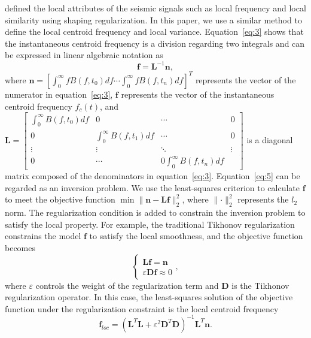 \cite{Fomel07a} defined the local attributes of the seismic signals
such as local frequency and local similarity using shaping
regularization. In this paper, we use a similar method to define the
local centroid frequency and local variance. Equation~\ref{eq:3} shows
that the instantaneous centroid frequency is a division regarding two
integrals and can be expressed in linear algebraic notation as
\begin{equation}
  \label{eq:5}
  \mathbf{f}=\mathbf{L}^{-1}\mathbf{n},
\end{equation}
where 
$\mathbf{n}=[\int_{0}^{\infty}fB(f,t_0)df \cdots \int_{0}^{\infty}fB(f,t_n)df]^T$
represents the vector of the numerator in equation~\ref{eq:3}, $\mathbf{f}$
represents the vector of the instantaneous centroid frequency $f_c(t)$, and
$\mathbf{L}=\begin{bmatrix}\int_{0}^{\infty}B(f,t_0)df & 0 & \cdots & 0 \\ 0 & \int_{0}^{\infty}B(f,t_1)df & \cdots & 0 \\ \vdots & \vdots & \ddots & \vdots \\ 0 & \cdots & 0 \int_{0}^{\infty}B(f,t_n)df \end{bmatrix}$
is a diagonal matrix composed of the denominators in equation~\ref{eq:3}.
Equation~\ref{eq:5} can be regarded as an inversion problem. We use the
least-squares criterion to calculate $\mathbf{f}$ to meet the objective 
function $\min\parallel{\mathbf{n}-\mathbf{L}\mathbf{f}}\parallel_2^2$, where
$\parallel \cdot \parallel_2^2$ represents the $l_2$ norm. The
regularization condition is added to constrain the inversion problem to
satisfy the local property. For example, the traditional Tikhonov
regularization constrains the model $\mathbf{f}$ to satisfy the local
smoothness, and the objective function becomes
\begin{equation}
  \label{eq:6}
  \begin{cases}
    \mathbf{L}\mathbf{f}=\mathbf{n} \\
    \varepsilon\mathbf{D}\mathbf{f}\approx0
  \end{cases},
\end{equation}
where $\varepsilon$ controls the weight of the regularization term and
$\mathbf{D}$ is the Tikhonov regularization operator. In this case, the
least-squares solution of the objective function under the regularization
constraint is the local centroid frequency
\begin{equation}
  \label{eq:7}
  \mathbf{f}_{loc}=(\mathbf{L}^{T}\mathbf{L}+\varepsilon^2\mathbf{D}^{T}
    \mathbf{D})^{-1}\mathbf{L}^{T}\mathbf{n}.
\end{equation}

